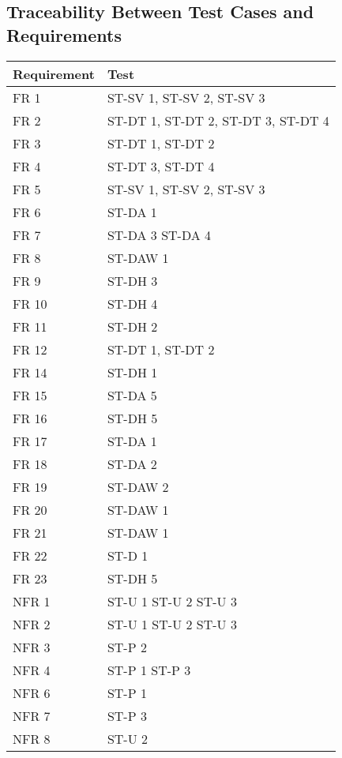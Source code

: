 \documentclass[12pt, titlepage]{article}
\begin{document}
\subsection{Traceability Between Test Cases and Requirements}
\begin{tabular}{| p{} | p{}|}
  \hline
  \rowcolor[gray]{0.9}
  Requirement & Test \\
  \hline
  FR 1 & ST-SV 1, ST-SV 2, ST-SV 3 \\
  \hline
  FR 2 & ST-DT 1, ST-DT 2, ST-DT 3, ST-DT 4 \\
  \hline
  FR 3 & ST-DT 1, ST-DT 2 \\
  \hline
  FR 4 & ST-DT 3, ST-DT 4 \\
  \hline
  FR 5 & ST-SV 1, ST-SV 2, ST-SV 3 \\
  \hline
  FR 6 & ST-DA 1 \\
  \hline
  FR 7 & ST-DA 3 ST-DA 4 \\
  \hline
  FR 8 & ST-DAW 1 \\
  \hline
  FR 9 & ST-DH 3 \\
  \hline
  FR 10 & ST-DH 4 \\
  \hline
  FR 11 & ST-DH 2 \\
  \hline
  FR 12 & ST-DT 1, ST-DT 2 \\
  \hline
  FR 14 & ST-DH 1 \\
  \hline
  FR 15 & ST-DA 5\\
  \hline
  FR 16 & ST-DH 5 \\
  \hline
  FR 17 & ST-DA 1 \\
  \hline
  FR 18 & ST-DA 2 \\
  \hline
  FR 19 & ST-DAW 2 \\
  \hline
  FR 20 & ST-DAW 1 \\
  \hline
  FR 21 & ST-DAW 1 \\
  \hline
  FR 22 & ST-D 1 \\
  \hline
  FR 23 & ST-DH 5 \\
  \hline
  NFR 1 & ST-U 1 ST-U 2 ST-U 3 \\
  \hline
  NFR 2 & ST-U 1 ST-U 2 ST-U 3 \\
  \hline
  NFR 3 & ST-P 2 \\
  \hline
  NFR 4 & ST-P 1 ST-P 3 \\
  \hline
  NFR 6 & ST-P 1 \\
  \hline
  NFR 7 & ST-P 3 \\
  \hline
  NFR 8 & ST-U 2 \\
  \hline
  
\end{tabular}
\end{document}
